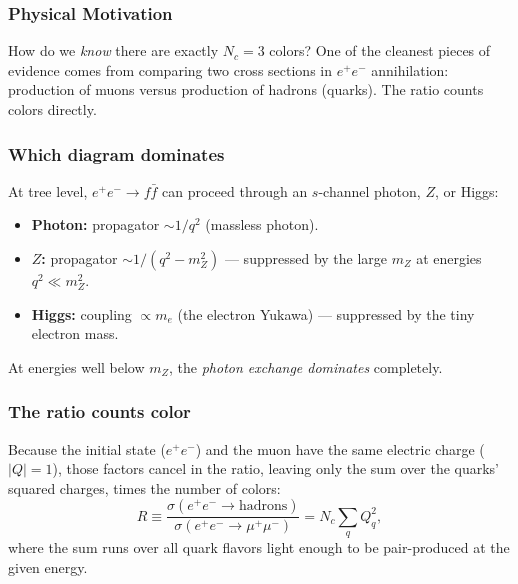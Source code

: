 \subsubsection*{Physical Motivation}

How do we \emph{know} there are exactly $N_c=3$ colors? One of the
cleanest pieces of evidence comes from comparing two cross sections in
$e^+e^-$ annihilation: production of muons versus production of hadrons
(quarks). The ratio counts colors directly.

\subsubsection*{Which diagram dominates}

At tree level, $e^+e^-\to f\bar f$ can proceed through an $s$-channel
photon, $Z$, or Higgs:
\begin{itemize}
  \item \textbf{Photon:} propagator $\sim 1/q^2$ (massless photon).
  \item \textbf{$Z$:} propagator $\sim 1/(q^2-m_Z^2)$ --- suppressed by
        the large $m_Z$ at energies $q^2\ll m_Z^2$.
  \item \textbf{Higgs:} coupling $\propto m_e$ (the electron Yukawa) ---
        suppressed by the tiny electron mass.
\end{itemize}
At energies well below $m_Z$, the \emph{photon exchange dominates}
completely.

\subsubsection*{The ratio counts color}

Because the initial state ($e^+e^-$) and the muon have the same electric
charge ($|Q|=1$), those factors cancel in the ratio, leaving only the
sum over the quarks' squared charges, times the number of colors:
\begin{equation}
  \boxed{
    R \equiv
    \frac{\sigma(e^+e^-\to \text{hadrons})}{\sigma(e^+e^-\to\mu^+\mu^-)}
    = N_c\sum_q Q_q^2 ,
  }
  \label{eq:lec21:Rratio}
\end{equation}
where the sum runs over all quark flavors light enough to be
pair-produced at the given energy.


